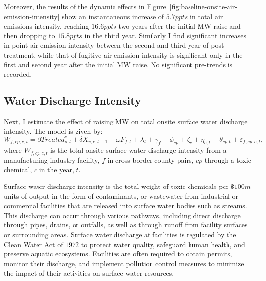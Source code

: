 \documentclass[authoryear, preprint, twocolumn, 1p]{elsarticle}
\begin{document}
    Moreover, the results of the dynamic effects in Figure~\ref{fig:baseline-onsite-air-emission-intensity} show an instantaneous increase of $5.7ppts$ in total air emissions intensity, reaching $16.6ppts$ two years after the initial MW raise and then dropping to $15.8ppts$ in the third year. Similarly I find significant increases in point air emission intensity between the second and third year of post treatment, while that of fugitive air emission intensity is significant only in the first and second year after the initial MW raise. No significant pre-trends is recorded.
    

    \subsection{Water Discharge Intensity}\label{subsec:water-discharge-intensity}
    Next, I estimate the effect of raising MW on total onsite surface water discharge intensity. The model is given by:
    \begin{equation}
        W_{f,cp,c,t} = \beta Treated_{s,t}^e + \delta X_{v,c,t-1} + \omega F_{f,t} + \lambda_{t} + \gamma_{f} + \phi_{cp} + \zeta_{c} + \eta_{c,t} + \theta_{cp,t} + \varepsilon_{f,cp,c,t},\label{eq:baseline-onsite-water-discharge-intensity}
    \end{equation}
    where $W_{f,cp,c,t}$ is the total onsite surface water discharge intensity from a manufacturing industry facility, $f$ in cross-border county pairs, $cp$ through a toxic chemical, $c$ in the year, $t$.

    Surface water discharge intensity is the total weight of toxic chemicals per $\$100m$ units of output in the form of contaminants, or wastewater from industrial or commercial facilities that are released into surface water bodies such as streams. This discharge can occur through various pathways, including direct discharge through pipes, drains, or outfalls, as well as through runoff from facility surfaces or surrounding areas. Surface water discharge at facilities is regulated by the Clean Water Act of $1972$ to protect water quality, safeguard human health, and preserve aquatic ecosystems. Facilities are often required to obtain permits, monitor their discharge, and implement pollution control measures to minimize the impact of their activities on surface water resources.
    
\end{document}

